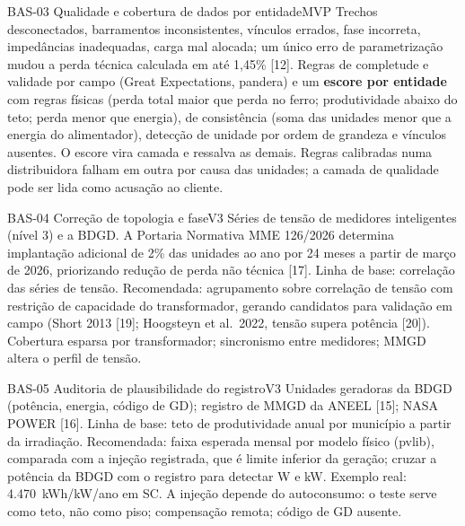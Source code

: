 \begin{ficha}{BAS-03 \textperiodcentered{} Qualidade e cobertura de dados por entidade}{MVP}
 Trechos desconectados, barramentos
inconsistentes, vínculos errados, fase incorreta, impedâncias inadequadas,
carga mal alocada; um único erro de parametrização mudou a perda técnica
calculada em até 1,45\% [12].
 Regras de completude e validade por campo (Great
Expectations, pandera) e um \textbf{escore por entidade} com regras físicas
(perda total maior que perda no ferro; produtividade abaixo do teto; perda
menor que energia), de consistência (soma das unidades menor que a energia do
alimentador), detecção de unidade por ordem de grandeza e vínculos ausentes.
O escore vira camada e ressalva as demais.
 Regras calibradas numa distribuidora falham em outra por
causa das unidades; a camada de qualidade pode ser lida como acusação ao
cliente.
\end{ficha}

\begin{ficha}{BAS-04 \textperiodcentered{} Correção de topologia e fase}{V3}
 Séries de tensão de medidores inteligentes (nível 3) e a BDGD.
A Portaria Normativa MME 126/2026 determina implantação adicional de 2\% das
unidades ao ano por 24 meses a partir de março de 2026, priorizando redução
de perda não técnica [17].
 Linha de base: correlação das séries de tensão.
Recomendada: agrupamento sobre correlação de tensão com restrição de
capacidade do transformador, gerando candidatos para validação em campo
(Short 2013 [19]; Hoogsteyn et al.\ 2022, tensão supera potência [20]).
 Cobertura esparsa por transformador; sincronismo entre
medidores; MMGD altera o perfil de tensão.
\end{ficha}

\begin{ficha}{BAS-05 \textperiodcentered{} Auditoria de plausibilidade do registro}{V3}
 Unidades geradoras da BDGD (potência, energia, código de GD);
registro de MMGD da ANEEL [15]; NASA POWER [16].
 Linha de base: teto de produtividade anual por município a
partir da irradiação. Recomendada: faixa esperada mensal por modelo físico
(pvlib), comparada com a injeção registrada, que é limite inferior da geração;
cruzar a potência da BDGD com o registro para detectar W e kW. Exemplo real:
4.470~kWh/kW/ano em SC.
 A injeção depende do autoconsumo: o teste serve como teto,
não como piso; compensação remota; código de GD ausente.
\end{ficha}


